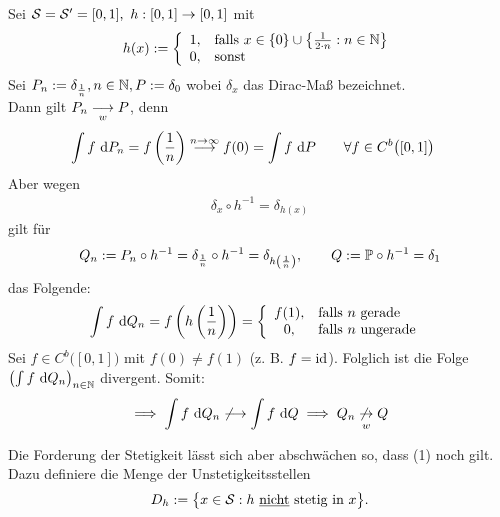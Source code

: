 \begin{beispiel} %
	Sei $\S=\S'=[0,1],~h:[0,1]\to[0,1]$ mit
	\begin{align*}
		h(x):=\left\lbrace\begin{array}{cl}
			1, &\falls x\in\lbrace 0\rbrace\cup\left\lbrace\frac{1}{2\cdot n}:n\in\N\right\rbrace\\
			0, & \sonst
		\end{array}\right.
	\end{align*}
	Sei $P_n:=\delta_{\frac{1}{n}},n\in\N,P:=\delta_{0}$ wobei $\delta_x$ das Dirac-Maß bezeichnet.\\
	Dann gilt $P_n\stackrelnew{w}{}{\longrightarrow} P$, denn
	\begin{align*}
		\int\limits f\d P_n&=f\left(\frac{1}{n}\right)\stackrel{n\to\infty}{\longrightarrow} f(0)=\int\limits f\d P\qquad\forall f\in C^b\big([0,1]\big)
	\end{align*}
	Aber wegen 
	\begin{align*}
		\delta_x\circ h^{-1}=\delta_{h(x)}
	\end{align*}
	gilt für
	\begin{align*}
		Q_n:=P_n\circ h^{-1}=\delta_{\frac{1}{n}}\circ h^{-1}=\delta_{h\left(\frac{1}{n}\right)},\qquad Q:=\P\circ h^{-1}=\delta_1
	\end{align*}
	das Folgende:
	\begin{align*}
		\int\limits f\d Q_n=f\left(h\left(\frac{1}{n}\right)\right)=\left\lbrace\begin{array}{cl}
			f(1), & \falls n\text{ gerade }\\
			0, & \falls n\text{ ungerade }
		\end{array}\right.
	\end{align*}
	Sei $f\in C^b\big([0,1]\big)$ mit $f(0)\neq f(1)$ (z. B. $f=\id$). 
	Folglich ist die Folge $\left(\int f\d Q_n\right)_{n\in\N}$ divergent. 
	Somit:
	\begin{align*}
		\implies\int\limits f\d Q_n\not\longrightarrow\int\limits f\d Q\implies Q_n\stackrelnew{w}{}{\not\to} Q
	\end{align*}
\end{beispiel}

Die Forderung der Stetigkeit lässt sich aber abschwächen so, dass (1) noch gilt. 
Dazu definiere die Menge der Unstetigkeitsstellen
\begin{align*}
	D_h:=\big\lbrace x\in\S: h\text{ \underline{nicht} stetig in }x\big\rbrace.
\end{align*}

